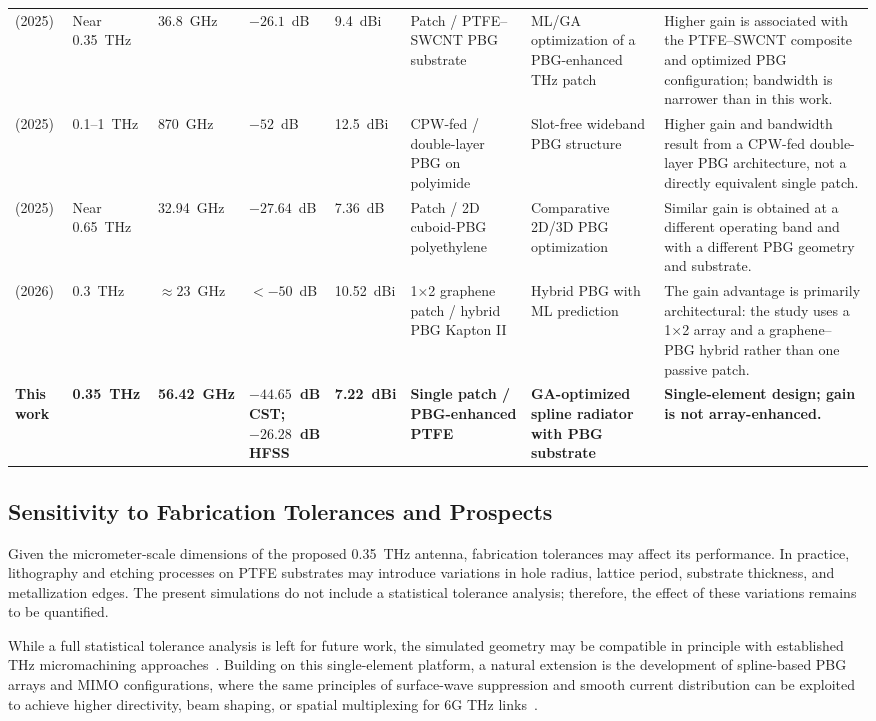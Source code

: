 \documentclass[a4paper,fleqn]{cas-dc}
\begin{document}
\begin{table}[t]
\begin{tabularx}{\linewidth}{@{}M{2.2cm}C{1.35cm}C{1.1cm}C{1.2cm}C{1.1cm}M{2.0cm}M{2.2cm}M{3.0cm}@{}}
\cite{babaahmed_hybrid_2025} (2025) & Near 0.35~THz & 36.8~GHz & $-26.1$~dB & 9.4~dBi & Patch / PTFE--SWCNT PBG substrate & ML/GA optimization of a PBG-enhanced THz patch & Higher gain is associated with the PTFE--SWCNT composite and optimized PBG configuration; bandwidth is narrower than in this work. \\
\cite{boujmil_pbg_2025} (2025) & 0.1--1~THz & 870~GHz & $-52$~dB & 12.5~dBi & CPW-fed / double-layer PBG on polyimide & Slot-free wideband PBG structure & Higher gain and bandwidth result from a CPW-fed double-layer PBG architecture, not a directly equivalent single patch. \\
\cite{bouzid_pbg_2025} (2025) & Near 0.65~THz & 32.94~GHz & $-27.64$~dB & 7.36~dB & Patch / 2D cuboid-PBG polyethylene & Comparative 2D/3D PBG optimization & Similar gain is obtained at a different operating band and with a different PBG geometry and substrate. \\
\cite{reguig_pbg_ml_2026} (2026) & 0.3~THz & $\approx23$~GHz & $<-50$~dB & 10.52~dBi & 1$\times$2 graphene patch / hybrid PBG Kapton II & Hybrid PBG with ML prediction & The gain advantage is primarily architectural: the study uses a 1$\times$2 array and a graphene--PBG hybrid rather than one passive patch. \\
\midrule
\textbf{This work} & \textbf{0.35~THz} & \textbf{56.42~GHz} & \textbf{$-44.65$~dB CST; $-26.28$~dB HFSS} & \textbf{7.22~dBi} & \textbf{Single patch / PBG-enhanced PTFE} & \textbf{GA-optimized spline radiator with PBG substrate} & \textbf{Single-element design; gain is not array-enhanced.} \\
\bottomrule
\end{tabularx}
\end{table}


\subsection{Sensitivity to Fabrication Tolerances and Prospects}
\label{subsec:tolerances}

Given the micrometer-scale dimensions of the proposed 0.35~THz antenna, fabrication tolerances may affect its performance. In practice, lithography and etching processes on PTFE substrates may introduce variations in hole radius, lattice period, substrate thickness, and metallization edges. The present simulations do not include a statistical tolerance analysis; therefore, the effect of these variations remains to be quantified.

While a full statistical tolerance analysis is left for future work, the simulated geometry may be compatible in principle with established THz micromachining approaches~\cite{he_overview_2020,hajiyat_antenna_2021}. Building on this single-element platform, a natural extension is the development of spline-based PBG arrays and MIMO configurations, where the same principles of surface-wave suppression and smooth current distribution can be exploited to achieve higher directivity, beam shaping, or spatial multiplexing for 6G THz links~\cite{nirob_grid_2025,mousa_ebg_2026}.
\end{document}
